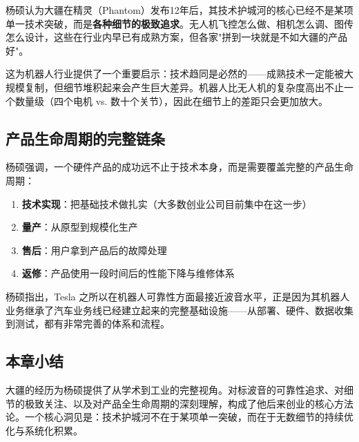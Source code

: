 杨硕认为大疆在精灵（Phantom）发布12年后，其技术护城河的核心已经不是某项单一技术突破，而是\textbf{各种细节的极致追求}。无人机飞控怎么做、相机怎么调、图传怎么设计，这些在行业内早已有成熟方案，但各家"拼到一块就是不如大疆的产品好"。

这为机器人行业提供了一个重要启示：技术趋同是必然的——成熟技术一定能被大规模复制，但细节堆积起来会产生巨大差异。机器人比无人机的复杂度高出不止一个数量级（四个电机 vs. 数十个关节），因此在细节上的差距只会更加放大。

\subsection{产品生命周期的完整链条}

杨硕强调，一个硬件产品的成功远不止于技术本身，而是需要覆盖完整的产品生命周期：

\begin{enumerate}
    \item \textbf{技术实现}：把基础技术做扎实（大多数创业公司目前集中在这一步）
    \item \textbf{量产}：从原型到规模化生产
    \item \textbf{售后}：用户拿到产品后的故障处理
    \item \textbf{返修}：产品使用一段时间后的性能下降与维修体系
\end{enumerate}

杨硕指出，Tesla 之所以在机器人可靠性方面最接近波音水平，正是因为其机器人业务继承了汽车业务线已经建立起来的完整基础设施——从部署、硬件、数据收集到测试，都有非常完善的体系和流程。

\subsection{本章小结}

大疆的经历为杨硕提供了从学术到工业的完整视角。对标波音的可靠性追求、对细节的极致关注、以及对产品全生命周期的深刻理解，构成了他后来创业的核心方法论。一个核心洞见是：技术护城河不在于某项单一突破，而在于无数细节的持续优化与系统化积累。



